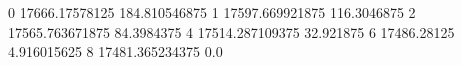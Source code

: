 0 17666.17578125 184.810546875
1 17597.669921875 116.3046875
2 17565.763671875 84.3984375
4 17514.287109375 32.921875
6 17486.28125 4.916015625
8 17481.365234375 0.0
